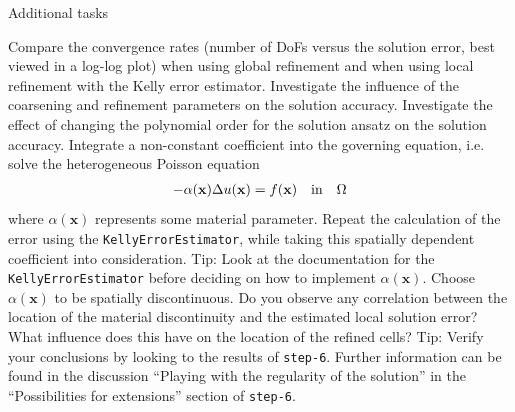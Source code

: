 \documentclass[11pt]{exam}
\begin{document}
\begin{questions}

\question Additional tasks
\begin{parts}
\bonuspart Compare the convergence rates (number of DoFs versus the solution error, best viewed in a log-log plot) when using global refinement and when using local refinement with the Kelly error estimator.
\bonuspart Investigate the influence of the coarsening and refinement parameters on the solution accuracy.
\bonuspart Investigate the effect of changing the polynomial order for the solution ansatz on the solution accuracy.
\bonuspart Integrate a non-constant coefficient into the governing equation, i.e. solve the heterogeneous Poisson equation
\begin{gather*}
-\alpha(\mathbf{x}) \Delta u(\mathbf{x}) = f(\mathbf{x}) \quad \textnormal{in} \quad \Omega
\end{gather*}
where $\alpha(\mathbf{x})$ represents some material parameter.
Repeat the calculation of the error using the \verb|KellyErrorEstimator|, while taking this spatially dependent coefficient into consideration. 
Tip: Look at the documentation for the \verb|KellyErrorEstimator| before deciding on how to implement $\alpha(\mathbf{x})$.
\bonuspart Choose $\alpha(\mathbf{x})$ to be spatially discontinuous.
Do you observe any correlation between the location of the material discontinuity and the estimated local solution error?
What influence does this have on the location of the refined cells?
Tip: Verify your conclusions by looking to the results of \verb|step-6|.
Further information can be found in the discussion ``Playing with the regularity of the solution'' in the ``Possibilities for extensions'' section of \verb|step-6|.
\end{parts}


\end{questions}
\end{document}
